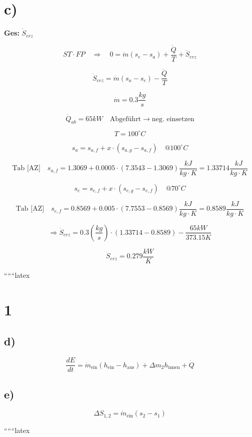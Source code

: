 \section*{c)}
\textbf{Ges:} $\dot{S}_{erz}$

\[
ST \cdot FP \quad \Rightarrow \quad 0 = \dot{m}(s_e - s_a) + \frac{\dot{Q}}{T} + \dot{S}_{erz}
\]

\[
\dot{S}_{erz} = \dot{m}(s_a - s_e) - \frac{\dot{Q}}{T}
\]

\[
\dot{m} = 0.3 \frac{kg}{s}
\]

\[
\dot{Q}_{ab} = 65 kW \quad \text{Abgeführt} \rightarrow \text{neg. einsetzen}
\]

\[
T = 100^\circ C
\]

\[
s_a = s_{a,f} + x \cdot (s_{a,g} - s_{a,f}) \quad @ 100^\circ C
\]

\[
\text{Tab [AZ]} \quad s_{a,f} = 1.3069 + 0.0005 \cdot (7.3543 - 1.3069) \frac{kJ}{kg \cdot K} = 1.33714 \frac{kJ}{kg \cdot K}
\]

\[
s_e = s_{e,f} + x \cdot (s_{e,g} - s_{e,f}) \quad @ 70^\circ C
\]

\[
\text{Tab [AZ]} \quad s_{e,f} = 0.8569 + 0.005 \cdot (7.7553 - 0.8569) \frac{kJ}{kg \cdot K} = 0.8589 \frac{kJ}{kg \cdot K}
\]

\[
\Rightarrow \dot{S}_{erz} = 0.3 \left( \frac{kg}{s} \right) \cdot (1.33714 - 0.8589) - \frac{65 kW}{373.15 K}
\]

\[
\dot{S}_{erz} = 0.279 \frac{kW}{K}
\]

``````latex


\section*{1}

\subsection*{d)}
\begin{equation*}
\frac{dE}{dt} = \dot{m}_{\text{ein}} \left( h_{\text{ein}} - h_{\text{aus}} \right) + \Delta m_2 h_{\text{innen}} + \dot{Q}
\end{equation*}

\subsection*{e)}
\begin{equation*}
\Delta S_{1,2} = \dot{m}_{\text{ein}} \left( s_2 - s_1 \right)
\end{equation*}

``````latex


